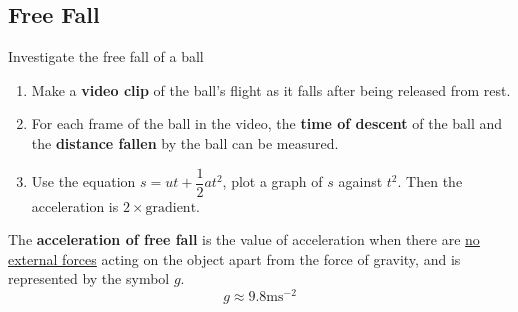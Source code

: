 \subsection{Free Fall}

Investigate the free fall of a ball
\begin{enumerate}
    \item Make a \textbf{video clip} of the ball's flight as it falls after being released from rest.
    \item For each frame of the ball in the video, the \textbf{time of descent} of the ball and the \textbf{distance fallen} by the ball can be measured.
    \item Use the equation $s=ut+\dfrac{1}{2}at^2$, plot a graph of $s$ against $t^2$. Then the acceleration is $2\times\text{gradient}$.
\end{enumerate}

The \textbf{acceleration of free fall} is the value of acceleration when there are \underline{no external forces} acting on the object apart from the force of gravity, and is represented by the symbol $g$.
$$g\approx9.8\text{ms}^{-2}$$
